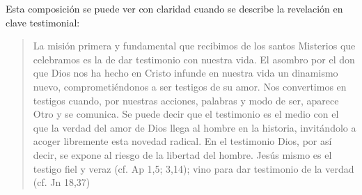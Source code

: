 Esta composición se puede ver con claridad cuando se describe la revelación en clave testimonial: \blockquote[][\,(SCa 85)]{La misión primera y fundamental que recibimos de los santos Misterios que celebramos es la de dar testimonio con nuestra vida. El asombro por el don que Dios nos ha hecho en Cristo infunde en nuestra vida un dinamismo nuevo, comprometiéndonos a ser testigos de su amor. Nos convertimos en testigos cuando, por nuestras acciones, palabras y modo de ser, aparece Otro y se comunica. Se puede decir que el testimonio es el medio con el que la verdad del amor de Dios llega al hombre en la historia, invitándolo a acoger libremente esta novedad radical. En el testimonio Dios, por así decir, se expone al riesgo de la libertad del hombre. Jesús mismo es el testigo fiel y veraz (cf. Ap 1,5; 3,14); vino para dar testimonio de la verdad (cf. Jn 18,37)}.

